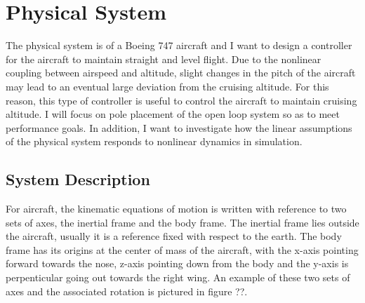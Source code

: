 \section{Physical System} \label{sec:physys}


The physical system is of a Boeing 747 aircraft and I want to
design a controller for the aircraft to maintain straight and level
flight. Due to the nonlinear coupling between airspeed and altitude,
slight changes in the pitch of the aircraft may lead to an eventual
large deviation from the cruising altitude. For this reason, this type
of controller is useful to control the aircraft to maintain cruising
altitude. I will focus on pole placement of the open loop system so as
to meet performance goals. In addition, I want to investigate how the
linear assumptions of the physical system responds to nonlinear
dynamics in simulation.

\subsection{System Description}

For aircraft, the kinematic equations of motion is written with
reference to two sets of axes, the inertial frame and the body
frame. The inertial frame lies outside the aircraft, usually it is a
reference fixed with respect to the earth. The body frame has its
origins at the center of mass of the aircraft, with the x-axis
pointing forward towards the nose, z-axis pointing down from the body
and the y-axis is perpenticular going out towards the right wing. An
example of these two sets of axes and the associated rotation is
pictured in figure ??.


